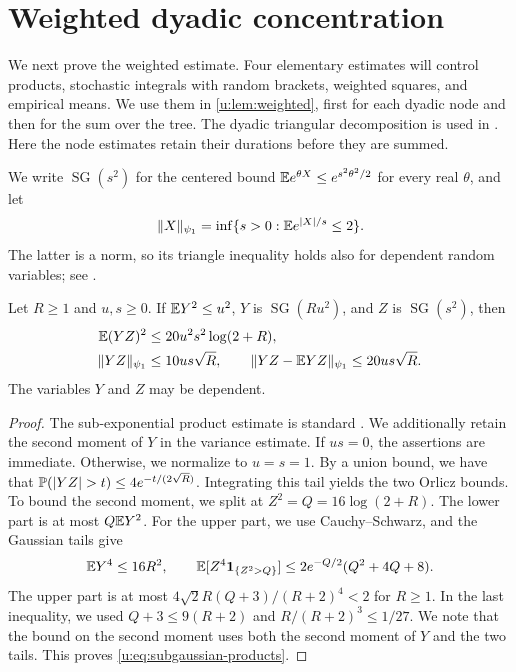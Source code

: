 \section{Weighted dyadic concentration}\label{u:sec:weighted}

We next prove the weighted estimate. Four elementary estimates will
control products, stochastic integrals with random brackets, weighted
squares, and empirical means. We use them in \cref{u:lem:weighted},
first for each dyadic node and then for the sum over the tree.
The dyadic triangular decomposition is used in
\cite[Section~4, proof of Proposition~5]{oai-typical-upper}. Here the
node estimates retain their durations before they are summed.

We write $\operatorname{SG}(s^2)$ for the centered bound
$\mathbb E e^{\theta X}\le e^{s^2\theta^2/2}$ for every real $\theta$, and let
\[
 \|X\|_{\psi_1}
 =\inf\{s>0:\mathbb E e^{|X|/s}\le2\}.
\]
The latter is a norm, so its triangle inequality holds also for
dependent random variables; see \cite[Section~2.7.1]{vershynin-2018}.

\begin{lemma}
\label{u:lem:subgaussian-products}
Let $R\ge1$ and $u,s\ge0$. If $\mathbb E Y^2\le u^2$, $Y$ is
$\operatorname{SG}(Ru^2)$, and $Z$ is $\operatorname{SG}(s^2)$, then
\begin{equation}\label{u:eq:subgaussian-products}
\begin{aligned}
 \mathbb E(YZ)^2&\le20u^2s^2\log(2+R),\\
 \|YZ\|_{\psi_1}&\le10us\sqrt R,\qquad
 \|YZ-\mathbb E YZ\|_{\psi_1}\le20us\sqrt R.
\end{aligned}
\end{equation}
The variables $Y$ and $Z$ may be dependent.
\end{lemma}

\begin{proof}
The sub-exponential product estimate is standard
\cite[Lemma~2.7.7]{vershynin-2018}. We additionally retain the second
moment of $Y$ in the variance estimate.
If $us=0$, the assertions are immediate. Otherwise, we normalize to
$u=s=1$. By a union bound, we have that
$\PP(|YZ|>t)\le4e^{-t/(2\sqrt R)}$. Integrating this tail yields
the two Orlicz bounds. To bound the second moment, we split at
$Z^2=Q=16\log(2+R)$. The lower part is at most $Q\mathbb E Y^2$. For the
upper part, we use Cauchy--Schwarz, and the Gaussian tails give
\[
 \mathbb E Y^4\le16R^2,\qquad
 \mathbb E[Z^4\mathbf 1_{\{Z^2>Q\}}]
 \le2e^{-Q/2}(Q^2+4Q+8).
\]
The upper part is at most $4\sqrt2R(Q+3)/(R+2)^4<2$ for $R\ge1$.
In the last inequality, we used $Q+3\le9(R+2)$ and
$R/(R+2)^3\le1/27$. We note that the bound on the second moment uses
both the second moment of $Y$ and the two tails. This proves
\eqref{u:eq:subgaussian-products}.
\end{proof}

